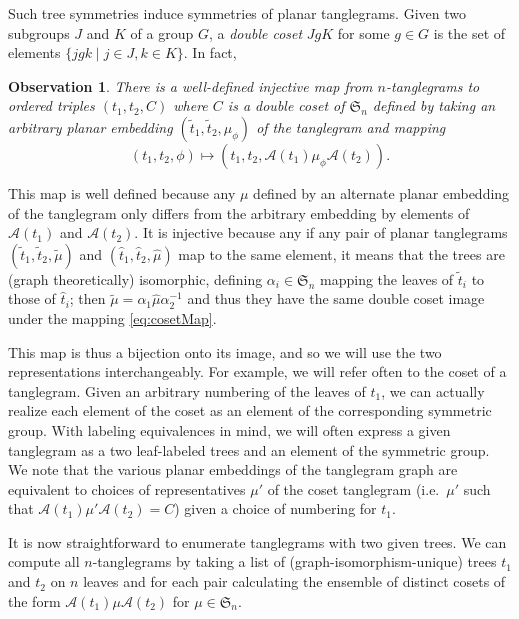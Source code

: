 \documentclass{amsart}
\newtheorem{observation}{Observation}
\newcommand{\fS}{\mathfrak S}
\newcommand{\aut}{\mathcal A}
\newcommand{\pairing}{\mu}
\begin{document}
Such tree symmetries induce symmetries of planar tanglegrams.
Given two subgroups $J$ and $K$ of a group $G$, a \emph{double coset} $JgK$ for some $g \in G$ is the set of elements $\{jgk \mid j \in J, k \in K\}$.
In fact,
\begin{observation}
There is a well-defined injective map from $n$-tanglegrams to ordered triples $(t_1, t_2, C)$ where $C$ is a double coset of $\fS_n$ defined by taking an arbitrary planar embedding $(\tilde t_1, \tilde t_2, \pairing_\phi)$ of the tanglegram and mapping
\begin{equation}
\label{eq:cosetMap}
(t_1, t_2, \phi) \mapsto (t_1, t_2, \aut(t_1) \pairing_\phi \aut(t_2)).
\end{equation}
\end{observation}
This map is well defined because any $\pairing$ defined by an alternate planar embedding of the tanglegram only differs from the arbitrary embedding by elements of $\aut(t_1)$ and $\aut(t_2)$.
It is injective because any if any pair of planar tanglegrams $(\tilde t_1, \tilde t_2, \tilde \pairing)$ and $(\hat t_1, \hat t_2, \hat \pairing)$ map to the same element, it means that the trees are (graph theoretically) isomorphic, defining $\alpha_i \in \fS_n$ mapping the leaves of $\tilde t_i$ to those of $\hat t_i$; then $\tilde \pairing = \alpha_1 \hat \pairing \alpha_2^{-1}$ and thus they have the same double coset image under the mapping \eqref{eq:cosetMap}.

This map is thus a bijection onto its image, and so we will use the two representations interchangeably.
For example, we will refer often to the coset of a tanglegram.
Given an arbitrary numbering of the leaves of $t_1$, we can actually realize each element of the coset as an element of the corresponding symmetric group.
With labeling equivalences in mind, we will often express a given tanglegram as a two leaf-labeled trees and an element of the symmetric group.
We note that the various planar embeddings of the tanglegram graph are equivalent to choices of representatives $\pairing'$ of the coset tanglegram (i.e.\ $\pairing'$ such that $\aut(t_1) \pairing' \aut(t_2) = C$) given a choice of numbering for $t_1$.

It is now straightforward to enumerate tanglegrams with two given trees.
We can compute all $n$-tanglegrams by taking a list of (graph-isomorphism-unique) trees $t_1$ and $t_2$ on $n$ leaves and for each pair calculating the ensemble of distinct cosets of the form $\aut(t_1) \pairing \aut(t_2)$ for $\pairing \in \fS_n$.
\end{document}
